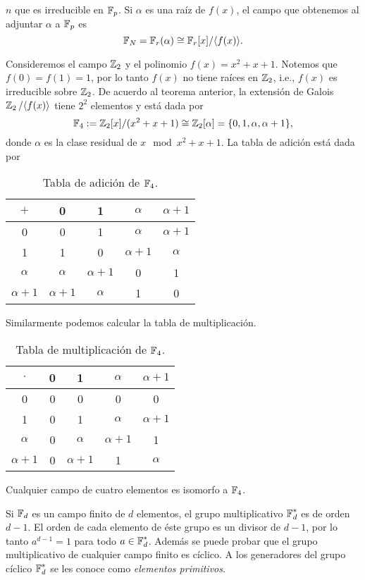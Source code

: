 $n$ que es irreducible en $\operatorname{\mathbb{F}}_p$.  Si $\alpha$ es una raíz
de $f(x)$, el campo que obtenemos al adjuntar $\alpha$ a
$\operatorname{\mathbb{F}}_p$ es
\begin{equation}
  \operatorname{\mathbb{F}}_N
  = \operatorname{\mathbb{F}}_r(\alpha) \cong \operatorname{\mathbb{F}}_r[x] / \langle f(x) \rangle.
\end{equation} 
\begin{example}
  Consideremos el campo $\operatorname{\mathbb{Z}}_2$ y el polinomio $f(x) = x^2
  + x + 1$. Notemos que $f(0) = f(1) = 1$, por lo tanto
  $f(x)$ no tiene raíces en $\operatorname{\mathbb{Z}}_2$, i.e., $f(x)$ es
  irreducible sobre $\operatorname{\mathbb{Z}}_2$. De acuerdo al teorema anterior,
  la extensión de Galois $\operatorname{\mathbb{Z}}_2 / \langle f(x) \rangle$ tiene
  $2^2$ elementos y está dada por
  \[
    \operatorname{\mathbb{F}}_4
    := \operatorname{\mathbb{Z}}_2[x] / (x^2 + x + 1)
    \cong \operatorname{\mathbb{Z}}_2[\alpha]
    = \{0, 1, \alpha, \alpha + 1\},
  \] 
  donde $\alpha$ es la clase residual de $x \mod x^2+x+1$.
  La tabla de adición está dada por
  \begin{table}[ht]
    \centering
    \label{tab:F4_addition}
    \begin{tabular}{c | c c c c}
      $+$ & 0 & 1 & $\alpha$ & $\alpha+1$ \\
      \hline
      0 & 0 & 1 & $\alpha$ & $\alpha+1$ \\
      1 & 1 & 0 & $\alpha + 1$ & $\alpha$ \\
      $\alpha$ & $\alpha$ & $\alpha+1$ & 0 & 1 \\
      $\alpha + 1$ & $\alpha+1$ & $\alpha$ & 1 & 0
    \end{tabular}
    \caption{Tabla de adición de $\operatorname{\mathbb{F}}_4$.}
  \end{table}
  Similarmente podemos calcular la tabla de multiplicación.
  \begin{table}[ht]
    \centering
    \label{tab:label}
    \begin{tabular}{c | c c c c}
      $\cdot$ & 0 & 1 & $\alpha$ & $\alpha+1$ \\
      \hline
      0 & 0 & 0 & 0 & 0 \\
      1 & 0 & 1 & $\alpha$ & $\alpha+1$ \\
      $\alpha$ & 0 & $\alpha$ & $\alpha+1$ & 1 \\
      $\alpha+1$ & 0 & $\alpha+1$ & 1 & $\alpha$\\
    \end{tabular}
    \caption{Tabla de multiplicación de $\operatorname{\mathbb{F}}_4$.}
  \end{table}
  Cualquier campo de cuatro elementos es isomorfo a $\operatorname{\mathbb{F}}_4$.
\end{example}
Si $\operatorname{\mathbb{F}}_d$ es un campo finito de $d$ elementos, el grupo
multiplicativo $\operatorname{\mathbb{F}}_d^{*}$ es de orden $d - 1$. El orden de
cada elemento de éste grupo es un divisor de $d-1$, por lo
tanto $a^{d-1} = 1$ para todo $a \in \operatorname{\mathbb{F}}_d^{*}$. Además se
puede probar que el grupo multiplicativo de cualquier campo
finito es cíclico. A los generadores del grupo cíclico
$\operatorname{\mathbb{F}}_d^{*}$ se les conoce como \textit{elementos primitivos}.


